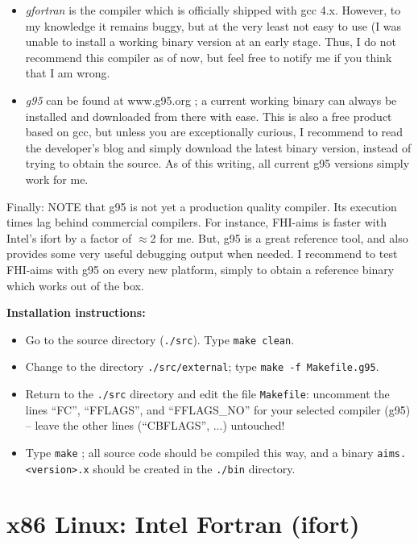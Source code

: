 \begin{itemize}
  \item \emph{gfortran} is the compiler which is officially shipped with gcc
    4.x. However, to my knowledge it remains buggy, but at the very
    least not easy to use (I was unable to install a working binary version at
    an early stage. Thus, I do not recommend this compiler as of now, but feel
    free to notify me if you think that I am wrong. 
  \item \emph{g95} can be found at www.g95.org ; a current working binary can
    always be installed and downloaded from there with ease. This is
    also a free product based on gcc, but unless you are exceptionally curious,
    I recommend to read the developer's blog and simply download the latest
    binary version, instead of trying to obtain the source. As of this writing,
    all current g95 versions simply work for me.
\end{itemize}

Finally: NOTE that g95 is not yet a production quality compiler. Its execution
times lag behind commercial compilers. For instance, FHI-aims is faster with 
Intel's ifort by a factor of $\approx$2 for me. But, g95 is a great
reference tool, and also provides some very useful debugging output when
needed. I recommend to test FHI-aims with g95 on every new platform, simply to
obtain a reference binary which works out of the box. 

\textbf{Installation instructions:}
\begin{itemize}
  \item Go to the source directory (\texttt{./src}). Type \texttt{make
    clean}. 
  \item Change to the directory \texttt{./src/external}; type \texttt{make
    -f Makefile.g95}. 
  \item Return to the \texttt{./src} directory and edit the file
    \texttt{Makefile}: uncomment the lines ``FC'', ``FFLAGS'', and
    ``FFLAGS\_NO'' for your selected compiler (g95) -- leave the other lines
    (``CBFLAGS'', ...) untouched!
  \item Type \texttt{make} ; all source code should be compiled this way, and
    a binary \texttt{aims.<version>.x} should be created in the
    \texttt{./bin} directory.
\end{itemize}

\section{x86 Linux: Intel Fortran (ifort)}


